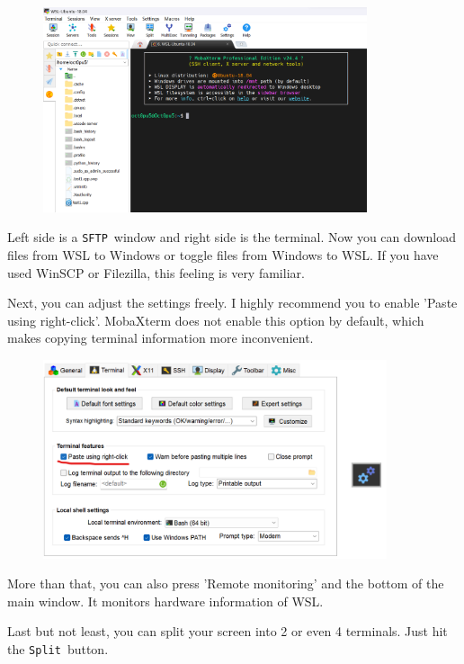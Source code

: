 \documentclass[12pt]{ctexart}
\begin{document}
\begin{figure}[H]
    \centering
    \includegraphics[width=0.85\textwidth,keepaspectratio]{assets/Linux/2.2 MobaXterm, go ssh it!/4.png}
\end{figure}

Left side is a \texttt{SFTP}\ window and right side is the terminal. Now
you can download files from WSL to Windows or toggle files from Windows
to WSL. If you have used WinSCP or Filezilla, this feeling is very
familiar.

Next, you can adjust the settings freely. I highly recommend you to
enable 'Paste using right-click'.
MobaXterm does not enable this option by default, which makes copying
terminal information more inconvenient.

\begin{figure}[H]
    \centering
    \includegraphics[width=0.9\textwidth,keepaspectratio]{assets/Linux/2.2 MobaXterm, go ssh it!/5.png}
\end{figure}

More than that, you can also press 'Remote
monitoring' and the bottom of the main window. It
monitors hardware information of WSL.

Last but not least, you can split your screen into 2 or even 4
terminals. Just hit the \texttt{Split}\ button.
\end{document}
